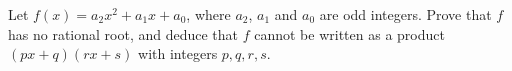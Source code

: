 Let $f(x)=a_2x^2+a_1x+a_0$, where $a_2$, $a_1$ and $a_0$ are odd integers. Prove that $f$ has no rational root, and deduce that $f$ cannot be written as a product $(px+q)(rx+s)$ with integers $p,q,r,s$.
